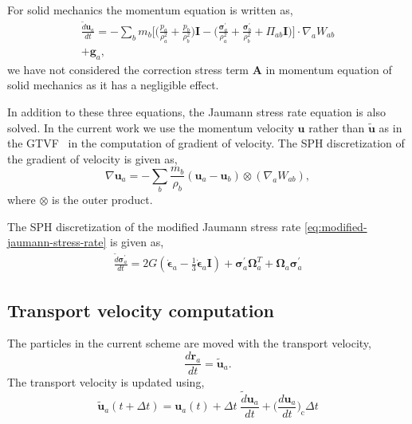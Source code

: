 \documentclass[10pt, conference]{FMFP2022}
\newcommand{\teng}[1]{\ensuremath{\boldsymbol{#1}}}
\newcommand{\ten}[1]{\ensuremath{\mathbf{#1}}}
\begin{document}
%
For solid mechanics the momentum equation is written as,
\begin{multline}
  \label{eq:sph-momentum-solid}
  \frac{\tilde{d}\ten{u}_{a}}{dt} = - \sum_{b} m_b \bigg[
  \bigg(\frac{p_a}{\rho_a^2} + \frac{p_b}{\rho_b^2}\bigg) \ten{I} -
  \bigg(\frac{\teng{\sigma}^{'}_{a}}{\rho_a^2} +
  \frac{\teng{\sigma}^{'}_{b}}{\rho_b^2} + \Pi_{ab} \ten{I} \bigg) \bigg]  \cdot \nabla_{a} W_{ab} \\
  + \ten{g}_{a},
\end{multline}
we have not considered the correction stress term $\ten{A}$ in momentum
equation of solid mechanics as it has a negligible effect.

In addition to these three equations, the Jaumann stress rate equation is also
solved. In the current work we use the momentum velocity $\ten{u}$ rather than
$\tilde{\ten{u}}$ as in the GTVF~\cite{zhang_hu_adams17} in the computation of
gradient of velocity. The SPH discretization of the gradient of velocity is
given as,
\begin{equation}
  \label{eq:sph-vel-grad}
  \nabla \ten{u}_a =
  - \sum_{b} \frac{m_b}{\rho_{b}} (\ten{u}_{a} - \ten{u}_{b}) \otimes (\nabla_{a} W_{ab}),
\end{equation}
where $\otimes$ is the outer product.

The SPH discretization of the modified Jaumann stress rate
\cref{eq:modified-jaumann-stress-rate} is given as,
\begin{multline}
  \label{eq:sph-modified-jaumann-stress}
  \frac{\tilde{d}\teng{\sigma}^{'}_{a}}{dt} = 2G (\dot{\teng{\epsilon}}_{a} -
  \frac{1}{3} \dot{\teng{\epsilon}}_{a} \ten{I}) + \teng{\sigma}^{'}_{a}
  \teng{\Omega}_{a}^{T} +
  \teng{\Omega}_{a} \teng{\sigma}^{'}_{a}
\end{multline}



\subsection{\textbf{Transport velocity computation}}\label{subsec:transport-velocity}


The particles in the current scheme are moved with the transport velocity,
\begin{equation}
  \label{eq:transport_velocity_position_derivative}
  \frac{d\ten{r}_a}{dt} = \ten{\tilde{u}}_a.
\end{equation}
%
The transport velocity is updated using,
\begin{equation}
  \label{eq:transport_velocity}
  \ten{\tilde{u}}_a(t + \Delta t) =\ten{u}_a(t) + \Delta t \; \frac{\tilde{d} \ten{u}_a}{dt} +
  \bigg(\frac{d \ten{u}_{a}}{dt}\bigg)_{\text{c}} \Delta t
\end{equation}
\end{document}
